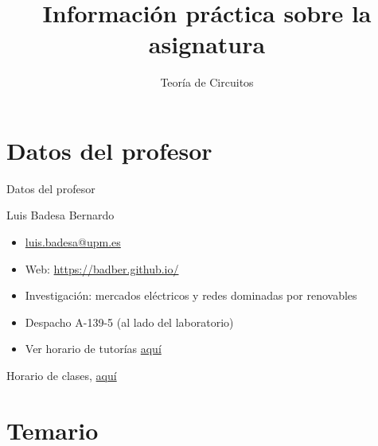 \documentclass[aspectratio=169, usenames,svgnames,dvipsnames]{beamer}
\date{}
\title{\LARGE Información práctica sobre la asignatura \vspace{5mm}}
\subtitle{Teoría de Circuitos}
\begin{document}
\maketitle

\section*{Datos del profesor}

\begin{frame}{Datos del profesor}
    
    Luis Badesa Bernardo
    \vspace{2mm}
        \begin{itemize}
        \item \href{mailto:luis.badesa@upm.es}{luis.badesa@upm.es}
        \vspace{1mm}
        \item Web: \url{https://badber.github.io/}
        \vspace{1mm}
        \item \alert{Investigación}: mercados eléctricos y redes dominadas por renovables
        \vspace{1mm}
        \item \alert{Despacho} A-139-5 (al lado del laboratorio)
        \vspace{1mm}
        \item Ver horario de tutorías 
        \href{http://programas.etsidi.upm.es/SOA/tutorias/}{aquí}            
    \end{itemize}
    \vspace{6mm}
    Horario de clases, \href{https://www.etsidi.upm.es/Estudiantes/AgendaAcademica/AAHorarioClases}{aquí}
    

\end{frame}


\section*{Temario}
\end{document}
